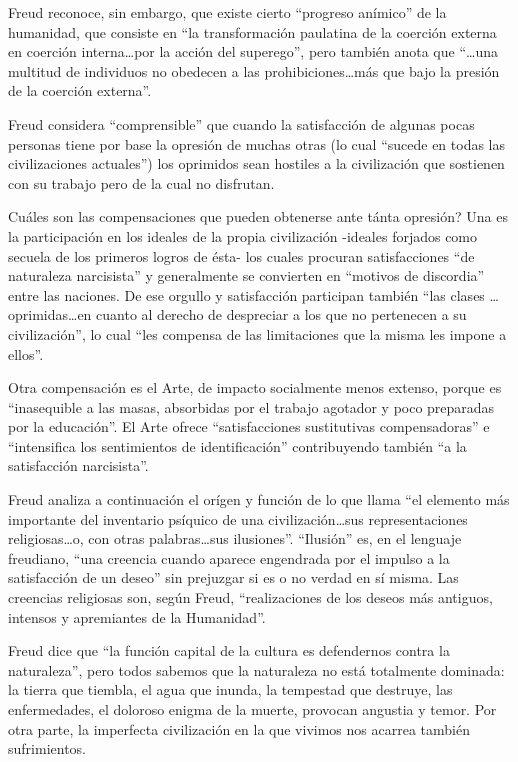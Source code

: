 \documentclass[
]{book}
\begin{document}
Freud reconoce, sin embargo, que existe cierto ``progreso anímico'' de la humanidad, que consiste en ``la transformación paulatina de la coerción externa en coerción interna\ldots por la acción del superego'', pero también anota que ``\ldots una multitud de individuos no obedecen a las prohibiciones\ldots más que bajo la presión de la coerción externa''.

Freud considera ``comprensible'' que cuando la satisfacción de algunas pocas personas tiene por base la opresión de muchas otras (lo cual ``sucede en todas las civilizaciones actuales'') los oprimidos sean hostiles a la civilización que sostienen con su trabajo pero de la cual no disfrutan.

Cuáles son las compensaciones que pueden obtenerse ante tánta opresión? Una es la participación en los ideales de la propia civilización -ideales forjados como secuela de los primeros logros de ésta- los cuales procuran satisfacciones ``de naturaleza narcisista'' y generalmente se convierten en ``motivos de discordia'' entre las naciones. De ese orgullo y satisfacción participan también ``las clases \ldots oprimidas\ldots en cuanto al derecho de despreciar a los que no pertenecen a su civilización'', lo cual ``les compensa de las limitaciones que la misma les impone a ellos''.

Otra compensación es el Arte, de impacto socialmente menos extenso, porque es ``inasequible a las masas, absorbidas por el trabajo agotador y poco preparadas por la educación''. El Arte ofrece ``satisfacciones sustitutivas compensadoras'' e ``intensifica los sentimientos de identificación'' contribuyendo también ``a la satisfacción narcisista''.

Freud analiza a continuación el orígen y función de lo que llama ``el elemento más importante del inventario psíquico de una civilización\ldots sus representaciones religiosas\ldots o, con otras palabras\ldots sus ilusiones''. ``Ilusión'' es, en el lenguaje freudiano, ``una creencia cuando aparece engendrada por el impulso a la satisfacción de un deseo'' sin prejuzgar si es o no verdad en sí misma. Las creencias religiosas son, según Freud, ``realizaciones de los deseos más antiguos, intensos y apremiantes de la Humanidad''.

Freud dice que ``la función capital de la cultura es defendernos contra la naturaleza'', pero todos sabemos que la naturaleza no está totalmente dominada: la tierra que tiembla, el agua que inunda, la tempestad que destruye, las enfermedades, el doloroso enigma de la muerte, provocan angustia y temor. Por otra parte, la imperfecta civilización en la que vivimos nos acarrea también sufrimientos.
\end{document}
